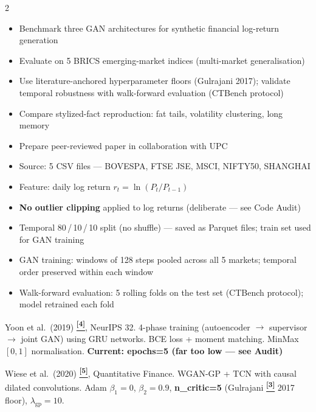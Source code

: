 \documentclass[10pt]{article}
\newcommand{\navybox}[2]{\begin{tcolorbox}[mybox={Navy}{LBg},title={#1}]#2\end{tcolorbox}}
\newcommand{\skybox}[2]{\begin{tcolorbox}[mybox={Sky}{BBg},title={#1}]#2\end{tcolorbox}}
\newcommand{\tcite}[1]{%
  \hyperlink{R:#1}{\textsuperscript{\scriptsize\textbf{[#1]}}}}
\begin{document}
\begin{multicols}{2}

\navybox{Research Goal}{%
\begin{itemize}
  \item Benchmark three GAN architectures for synthetic financial log-return generation
  \item Evaluate on 5 BRICS emerging-market indices (multi-market generalisation)
  \item Use literature-anchored hyperparameter floors (Gulrajani 2017); validate temporal robustness with walk-forward evaluation (CTBench protocol)
  \item Compare stylized-fact reproduction: fat tails, volatility clustering, long memory
  \item Prepare peer-reviewed paper in collaboration with UPC
\end{itemize}}

\skybox{Data Pipeline}{%
\begin{itemize}
  \item Source: 5 CSV files --- BOVESPA, FTSE JSE, MSCI, NIFTY50, SHANGHAI
  \item Feature: daily log return $r_t = \ln(P_t / P_{t-1})$
  \item \textbf{No outlier clipping} applied to log returns (deliberate --- see Code Audit)
  \item Temporal 80\,/\,10\,/\,10 split (no shuffle) --- saved as Parquet files; train set used for GAN training
  \item GAN training: windows of 128 steps pooled across all 5 markets; temporal order preserved within each window
  \item Walk-forward evaluation: 5 rolling folds on the test set (CTBench protocol); model retrained each fold
\end{itemize}}

\columnbreak

\begin{tcolorbox}[mybox={TGcol}{ABg},title={TimeGAN}]
Yoon et al.\ (2019)\tcite{4}, NeurIPS 32. 4-phase training (autoencoder $\to$ supervisor $\to$ joint GAN) using GRU networks. BCE loss + moment matching. MinMax $[0,1]$ normalisation.
\textcolor{DRed}{\bfseries\small Current: epochs=5 (far too low --- see Audit)}
\end{tcolorbox}

\begin{tcolorbox}[mybox={QGcol}{BBg},title={QuantGAN}]
Wiese et al.\ (2020)\tcite{5}, Quantitative Finance. WGAN-GP + TCN with causal dilated convolutions. Adam $\beta_1=0$, $\beta_2=0.9$, \textbf{n\_critic=5} (Gulrajani\tcite{3} 2017 floor), $\lambda_\text{gp}=10$.
\end{tcolorbox}


\end{multicols}
\end{document}
